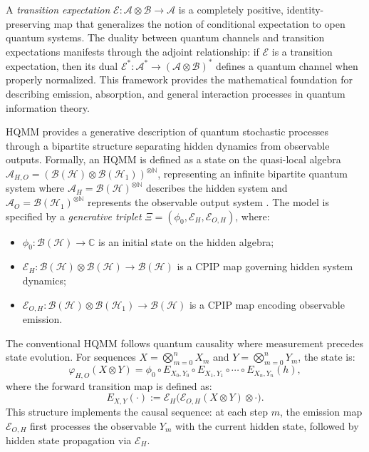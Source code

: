 \documentclass[12pt,a4paper]{article}
\begin{document}
A \emph{transition expectation} $\mathcal{E}: \mathcal{A} \otimes \mathcal{B} \to \mathcal{A}$ is a completely positive, identity-preserving map that generalizes the notion of conditional expectation to open quantum systems. The duality between quantum channels and transition expectations manifests through the adjoint relationship: if $\mathcal{E}$ is a transition expectation, then its dual $\mathcal{E}^*: \mathcal{A}^* \to (\mathcal{A} \otimes \mathcal{B})^*$ defines a quantum channel when properly normalized. This framework provides the mathematical foundation for describing emission, absorption, and general interaction processes in quantum information theory.



 HQMM  provides a generative description of quantum stochastic processes through a bipartite structure separating hidden dynamics from observable outputs. Formally, an HQMM is defined as a state on the quasi-local algebra $\mathcal{A}_{H,O} = (\mathcal{B}(\mathcal{H}) \otimes \mathcal{B}(\mathcal{H}_{1}))^{\otimes \mathbb{N}}$, representing an infinite bipartite quantum system where $\mathcal{A}_{H} = \mathcal{B}(\mathcal{H})^{\otimes \mathbb{N}}$ describes the hidden system and $\mathcal{A}_{O} = \mathcal{B}(\mathcal{H}_{1})^{\otimes \mathbb{N}}$ represents the observable output system  \cite{AGLS24Q}. The model is specified by a \emph{generative triplet} $\Xi = (\phi_0, \mathcal{E}_H, \mathcal{E}_{O,H})$, where:

\begin{itemize}
    \item $\phi_0: \mathcal{B}(\mathcal{H})\to \mathbb{C}$ is an initial state on the hidden algebra;
    \item $\mathcal{E}_{H}: \mathcal{B}(\mathcal{H}) \otimes \mathcal{B}(\mathcal{H}) \to \mathcal{B}(\mathcal{H})$ is a CPIP map governing hidden system dynamics;
    \item $\mathcal{E}_{O,H}: \mathcal{B}(\mathcal{H}) \otimes \mathcal{B}(\mathcal{H}_{1})\to \mathcal{B}(\mathcal{H})$ is a CPIP map encoding observable emission.
\end{itemize}

The conventional HQMM follows quantum causality where measurement precedes state evolution. For sequences $X = \bigotimes_{m=0}^n X_m$ and $Y = \bigotimes_{m=0}^n Y_m$, the state is:
\begin{equation}\label{eq:standard_HQMM}
\varphi_{H,O}(X \otimes Y) = \phi_0 \circ E_{X_0,Y_0} \circ E_{X_1,Y_1} \circ \cdots \circ E_{X_n,Y_n}(h),
\end{equation}
where the forward transition map is defined as:
\begin{equation}\label{eq:E_map}
E_{X,Y}(\cdot) := \mathcal{E}_H \big( \mathcal{E}_{O,H}(X \otimes Y) \otimes \cdot \big).
\end{equation}
This structure implements the causal sequence: at each step $m$, the emission map $\mathcal{E}_{O,H}$ first processes the observable $Y_m$ with the current hidden state, followed by hidden state propagation via $\mathcal{E}_{H}$.
\end{document}
